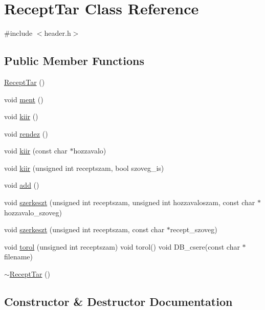 \hypertarget{class_recept_tar}{}\section{Recept\+Tar Class Reference}
\label{class_recept_tar}


{\ttfamily \#include $<$header.\+h$>$}

\subsection*{Public Member Functions}
\begin{DoxyCompactItemize}
\item 
\hyperlink{class_recept_tar_a584cf64034a95954a64735b120d0c1e1}{Recept\+Tar} ()
\item 
void \hyperlink{class_recept_tar_ad5d51f4e5e2dff4b69ed3dd75e8d0ee6}{ment} ()
\item 
void \hyperlink{class_recept_tar_af879cc543acd7ce6bbd5582a78dd98ef}{kiir} ()
\item 
void \hyperlink{class_recept_tar_a406166f3069ca65aa67a9c5949e35aed}{rendez} ()
\item 
void \hyperlink{class_recept_tar_af72eeaf3eff229c3ed4876b5d9f4784a}{kiir} (const char $\ast$hozzavalo)
\item 
void \hyperlink{class_recept_tar_a4d9b45f064b658e95c308fe16082f723}{kiir} (unsigned int receptszam, bool szoveg\+\_\+is)
\item 
void \hyperlink{class_recept_tar_a126f98e8e57e856112b2fbbd954462ab}{add} ()
\item 
void \hyperlink{class_recept_tar_a0f1d7f94b0f15e41ce9efb2d5ea864c1}{szerkeszt} (unsigned int receptszam, unsigned int hozzavaloszam, const char $\ast$hozzavalo\+\_\+szoveg)
\item 
void \hyperlink{class_recept_tar_a91957e07ed43d02f6a8b3bec33fb2e5f}{szerkeszt} (unsigned int receptszam, const char $\ast$recept\+\_\+szoveg)
\item 
void \hyperlink{class_recept_tar_a4abe77965235560d552cffe1b20dc759}{torol} (unsigned int receptszam) void torol() void D\+B\+\_\+csere(const char $\ast$filename)
\item 
\hyperlink{class_recept_tar_a387564e70892568e711a4b357c872603}{$\sim$\+Recept\+Tar} ()
\end{DoxyCompactItemize}


\subsection{Constructor \& Destructor Documentation}
\hypertarget{class_recept_tar_a584cf64034a95954a64735b120d0c1e1}{}
